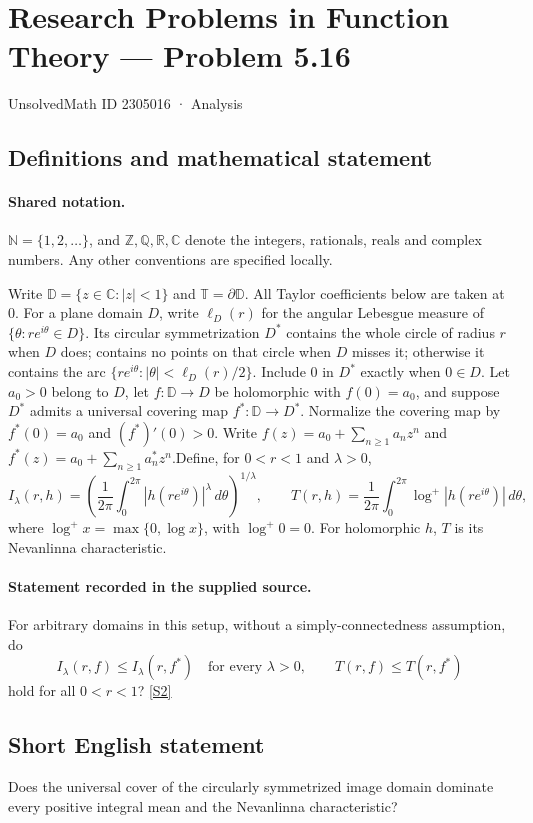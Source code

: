 \documentclass[11pt]{article}
\newcommand{\sref}[2]{\hyperlink{source:#1:#2}{[S#2]}}
\begin{document}
\setcounter{section}{2305015}
\section{Research Problems in Function Theory — Problem 5.16}\label{2305016}
{\small\sffamily UnsolvedMath ID 2305016 · Analysis}
\subsection{Definitions and mathematical statement}

\paragraph{Shared notation.}$\mathbb N=\{1,2,\ldots\}$, and $\mathbb Z,\mathbb Q,\mathbb R,\mathbb C$ denote the integers, rationals, reals and complex numbers. Any other conventions are specified locally.


Write $\mathbb D=\{z\in\mathbb C:|z|<1\}$ and $\mathbb T=\partial\mathbb D$. All Taylor coefficients below are taken at $0$. For a plane domain $D$, write $\ell_D(r)$ for the angular Lebesgue measure of $\{\theta:re^{i\theta}\in D\}$. Its circular symmetrization $D^*$ contains the whole circle of radius $r$ when $D$ does; contains no points on that circle when $D$ misses it; otherwise it contains the arc $\{re^{i\theta}:|\theta|<\ell_D(r)/2\}$. Include $0$ in $D^*$ exactly when $0\in D$. Let $a_0>0$ belong to $D$, let $f:\mathbb D\to D$ be holomorphic with $f(0)=a_0$, and suppose $D^*$ admits a universal covering map $f^*:\mathbb D\to D^*$. Normalize the covering map by $f^*(0)=a_0$ and $(f^*)'(0)>0$. Write $f(z)=a_0+\sum_{n\ge1}a_nz^n$ and $f^*(z)=a_0+\sum_{n\ge1}a_n^*z^n$.Define, for $0<r<1$ and $\lambda>0$,
\[I_\lambda(r,h)=\left(\frac1{2\pi}\int_0^{2\pi}|h(re^{i\theta})|^\lambda\,d\theta\right)^{1/\lambda},\qquad
T(r,h)=\frac1{2\pi}\int_0^{2\pi}\log^+|h(re^{i\theta})|\,d\theta,\]
where $\log^+x=\max\{0,\log x\}$, with $\log^+0=0$. For holomorphic $h$, $T$ is its Nevanlinna characteristic.
\paragraph{Statement recorded in the supplied source.}
For arbitrary domains in this setup, without a simply-connectedness assumption, do
\[I_\lambda(r,f)\le I_\lambda(r,f^*)\quad\text{for every }\lambda>0,\qquad
T(r,f)\le T(r,f^*)\]
hold for all $0<r<1$? \sref{2305016}{2}
\subsection{Short English statement}
Does the universal cover of the circularly symmetrized image domain dominate every positive integral mean and the Nevanlinna characteristic?
\end{document}
